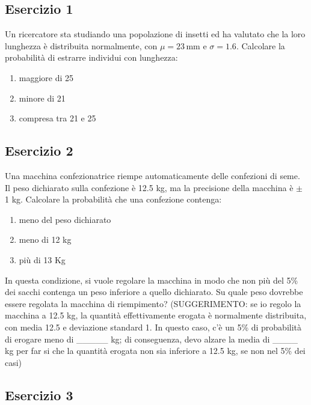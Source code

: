 \documentclass[a4paper,12pt,oneside]{book}
\providecommand{\tightlist}{%
  \setlength{\itemsep}{0pt}\setlength{\parskip}{0pt}}
\begin{document}
\hypertarget{esercizio-1-2}{%
\subsection{Esercizio 1}\label{esercizio-1-2}}

Un ricercatore sta studiando una popolazione di insetti ed ha valutato che la loro lunghezza è distribuita normalmente, con \(\mu = 23 \, \textrm{mm}\) e \(\sigma = 1.6\). Calcolare la probabilità di estrarre individui con lunghezza:

\begin{enumerate}
\def\labelenumi{\arabic{enumi}.}
\tightlist
\item
  maggiore di 25
\item
  minore di 21
\item
  compresa tra 21 e 25
\end{enumerate}

\hypertarget{esercizio-2-2}{%
\subsection{Esercizio 2}\label{esercizio-2-2}}

Una macchina confezionatrice riempe automaticamente delle confezioni di seme. Il peso dichiarato sulla confezione è 12.5 kg, ma la precisione della macchina è \(\pm\) 1 kg. Calcolare la probabilità che una confezione contenga:

\begin{enumerate}
\def\labelenumi{\arabic{enumi}.}
\tightlist
\item
  meno del peso dichiarato
\item
  meno di 12 kg
\item
  più di 13 Kg
\end{enumerate}

In questa condizione, si vuole regolare la macchina in modo che non più del 5\% dei sacchi contenga un peso inferiore a quello dichiarato. Su quale peso dovrebbe essere regolata la macchina di riempimento? (SUGGERIMENTO: se io regolo la macchina a 12.5 kg, la quantità effettivamente erogata è normalmente distribuita, con media 12.5 e deviazione standard 1. In questo caso, c'è un 5\% di probabilità di erogare meno di \_\_\_\_\_ kg; di conseguenza, devo alzare la media di \_\_\_\_ kg per far si che la quantità erogata non sia inferiore a 12.5 kg, se non nel 5\% dei casi)

\hypertarget{esercizio-3-2}{%
\subsection{Esercizio 3}\label{esercizio-3-2}}
\end{document}
